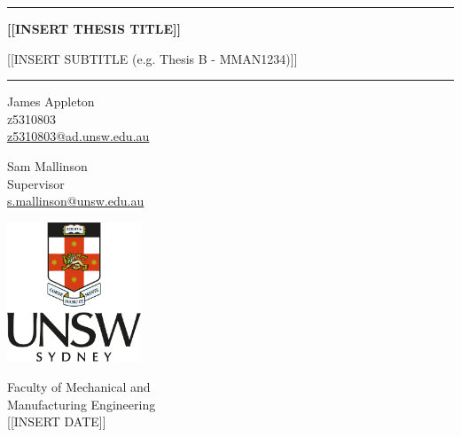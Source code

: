 \begin{titlepage}
	\centering

	\vspace*{1cm}
	\rule{\textwidth}{1pt}

	\vspace{.7\baselineskip}
	{\huge \textbf{[[INSERT THESIS TITLE]]}}

	\vspace*{.5cm}
	{\LARGE [[INSERT SUBTITLE (e.g. Thesis B - MMAN1234)]]}

	\rule{\textwidth}{1pt}
	\vspace{1cm}

	\large
	\begin{minipage}{.5\textwidth}
		\centering
		James Appleton \\
		\textsc{z5310803} \\
		{\normalsize \url{z5310803@ad.unsw.edu.au}}
	\end{minipage}%
	\begin{minipage}{.5\textwidth}
		\centering
		Sam Mallinson \\
		Supervisor \\ %
		{\normalsize \url{s.mallinson@unsw.edu.au}}
	\end{minipage}%

	\vspace{3cm}
	\includegraphics[width=0.3\textwidth]{figures/0-unsw-logo.png}
	\vfill

	Faculty of Mechanical and \\
	Manufacturing Engineering \\
	\vspace*{0.5cm}
	[[INSERT DATE]]

\end{titlepage}
